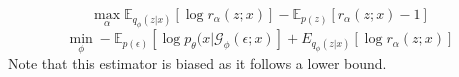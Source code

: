 \documentclass[a4paper,12pt]{article}
\begin{document}
\[\max_\alpha \mathbb{E}_{q_\phi(z|x)}[\log r_\alpha(z;x)]-\mathbb{E}_{p(z)}[r_\alpha(z;x)-1]\]
\[\min_\phi -\mathbb{E}_{p(\epsilon)}\left[\log p_\theta(x|\mathcal{G}_\phi(\epsilon;x)\right]+E_{q_\phi (z|x)}[\log r_\alpha(z;x)]\]
Note that this estimator is biased as it follows a lower bound.
\newpage
\end{document}
